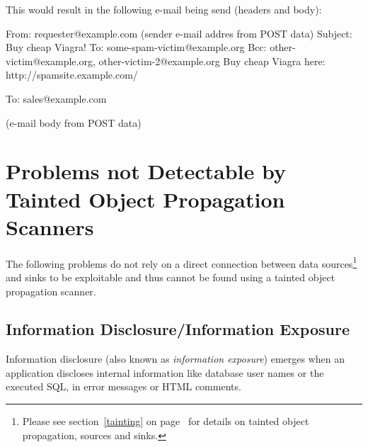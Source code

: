 This would result in the following e-mail being send (headers and body):

\begin{textcode}
From: requester@example.com (sender e-mail addres from POST data)
Subject: Buy cheap Viagra!
To: some-spam-victim@example.org
Bcc: other-victim@example.org, other-victim-2@example.org
Buy cheap Viagra here: http://spamsite.example.com/

To: sales@example.com

(e-mail body from POST data)
\end{textcode}



\section{Problems not Detectable by Tainted Object Propagation Scanners}
The following problems do not rely on a direct connection between data sources\footnote{Please see section~\ref{tainting} on page~\pageref{tainting} for details on tainted object propagation, sources and sinks.} and sinks to be exploitable and thus cannot be found using a tainted object propagation scanner.



\subsection{Information Disclosure/Information Exposure}
\label{information-disclosure}
Information disclosure (also known as \emph{information exposure}) emerges when an application discloses internal information like database user names or the executed SQL, \eg in error messages or HTML comments.

